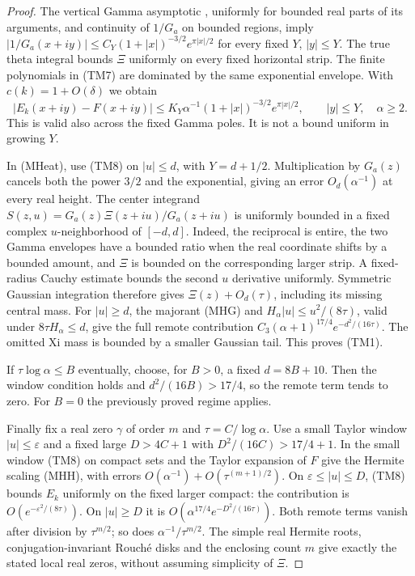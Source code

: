 \documentclass[11pt]{article}
\theoremstyle{remark}\newtheorem{remark}[theorem]{Remark}
\begin{document}
\begin{proof}
The vertical Gamma asymptotic \cite[5.11.9]{DLMFGamma}, uniformly
for bounded real parts of its arguments, and continuity of $1/G_a$
on bounded regions, imply
$|1/G_a(x+iy)|\le C_Y(1+|x|)^{-3/2}e^{\pi|x|/2}$
for every fixed $Y$, $|y|\le Y$.
The true theta integral bounds $\Xi$ uniformly on every fixed
horizontal strip. The finite polynomials in (TM7) are dominated
by the same exponential envelope. With $c(k)=1+O(\delta)$ we obtain
\[
 |E_k(x+iy)-F(x+iy)|
 \le K_Y\alpha^{-1}(1+|x|)^{-3/2}e^{\pi|x|/2},
           \qquad |y|\le Y,\quad\alpha\ge2.               \tag{TM8}
\]
This is valid also across the fixed Gamma poles.
It is not a bound uniform in growing $Y$.

In (MHeat), use (TM8) on $|u|\le d$, with $Y=d+1/2$.
Multiplication by $G_a(z)$ cancels both the power $3/2$ and
the exponential, giving an error $O_d(\alpha^{-1})$ at every
real height. The center integrand
$S(z,u)=G_a(z)\Xi(z+iu)/G_a(z+iu)$ is uniformly bounded in
a fixed complex $u$-neighborhood of $[-d,d]$.
Indeed, the reciprocal is entire, the two Gamma envelopes have
a bounded ratio when the real coordinate shifts by a bounded
amount, and $\Xi$ is bounded on the corresponding larger strip.
A fixed-radius Cauchy estimate bounds the second $u$ derivative
uniformly. Symmetric Gaussian integration therefore gives
$\Xi(z)+O_d(\tau)$, including its missing central mass.
For $|u|\ge d$, the majorant (MHG) and
$H_\alpha|u|\le u^2/(8\tau)$, valid under $8\tau H_\alpha\le d$,
give the full remote contribution
$C_3(\alpha+1)^{17/4}e^{-d^2/(16\tau)}$.
The omitted Xi mass is bounded by a smaller Gaussian tail.
This proves (TM1).

If $\tau\log\alpha\le B$ eventually, choose, for $B>0$,
a fixed $d=8B+10$. Then the window condition holds and
$d^2/(16B)>17/4$, so the remote term tends to zero.
For $B=0$ the previously proved regime applies.

Finally fix a real zero $\gamma$ of order $m$ and
$\tau=C/\log\alpha$. Use a small Taylor window
$|u|\le\varepsilon$ and a fixed large $D>4C+1$ with
$D^2/(16C)>17/4+1$.
In the small window (TM8) on compact sets and the Taylor
expansion of $F$ give the Hermite scaling (MHH), with errors
$O(\alpha^{-1})+O(\tau^{(m+1)/2})$.
On $\varepsilon\le|u|\le D$, (TM8) bounds $E_k$ uniformly
on the fixed larger compact: the contribution is
$O(e^{-\varepsilon^2/(8\tau)})$.
On $|u|\ge D$ it is
$O(\alpha^{17/4}e^{-D^2/(16\tau)})$.
Both remote terms vanish after division by $\tau^{m/2}$;
so does $\alpha^{-1}/\tau^{m/2}$.
The simple real Hermite roots, conjugation-invariant
Rouch\'e disks and the enclosing count $m$ give exactly the
stated local real zeros, without assuming simplicity of $\Xi$.
\end{proof}
\end{document}
